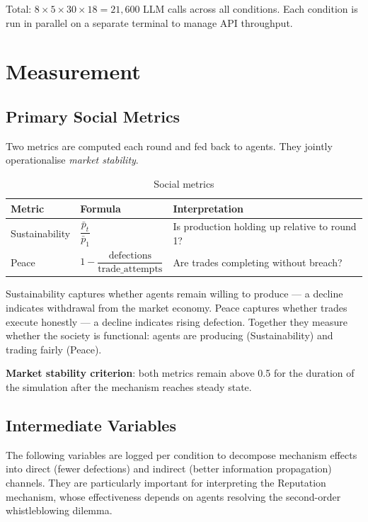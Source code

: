 \documentclass[12pt, a4paper]{article}
\begin{document}
Total: $8 \times 5 \times 30 \times 18 = 21{,}600$ LLM calls across all conditions. Each condition is run in parallel on a separate terminal to manage API throughput.

\section{Measurement}
\label{sec:measurement}

\subsection{Primary Social Metrics}

Two metrics are computed each round and fed back to agents. They jointly operationalise \textit{market stability}.

\begin{table}[H]
\centering
\caption{Social metrics}
\label{tab:metrics}
\begin{tabular}{@{}lll@{}}
\toprule
Metric & Formula & Interpretation \\
\midrule
Sustainability & $\dfrac{\bar{p}_t}{\bar{p}_1}$                               & Is production holding up relative to round 1? \\[8pt]
Peace         & $1 - \dfrac{\text{defections}}{\text{trade\_attempts}}$        & Are trades completing without breach? \\
\bottomrule
\end{tabular}
\end{table}

Sustainability captures whether agents remain willing to produce — a decline indicates withdrawal from the market economy. Peace captures whether trades execute honestly — a decline indicates rising defection. Together they measure whether the society is functional: agents are producing (Sustainability) and trading fairly (Peace).

\textbf{Market stability criterion}: both metrics remain above 0.5 for the duration of the simulation after the mechanism reaches steady state.

\subsection{Intermediate Variables}

The following variables are logged per condition to decompose mechanism effects into direct (fewer defections) and indirect (better information propagation) channels. They are particularly important for interpreting the Reputation mechanism, whose effectiveness depends on agents resolving the second-order whistleblowing dilemma.
\end{document}
